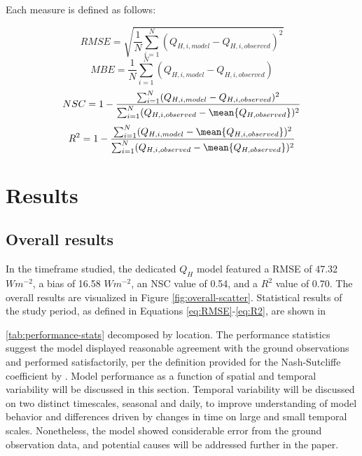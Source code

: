 Each measure is defined as follows:

\begin{equation} \label{eq:RMSE}
    RMSE = \sqrt{\frac{1}{N} \sum_{i=1}^{N}(Q_{H, i, model} - Q_{H, i, observed})^2}
\end{equation}
\begin{equation} \label{eq:MBE}
    MBE = \frac{1}{N} \sum_{i=1}^{N} (Q_{H, i, model} - Q_{H, i, observed})
\end{equation}
\begin{equation} \label{eq:NSC}
    NSC = 1 - \frac{\sum_{i=1}^{N} (Q_{H, i, model} - Q_{H, i, observed})^2}{\sum_{i=1}^{N}(Q_{H, i, observed} - \mean{Q_{H, observed}})^2}
\end{equation} 
\begin{equation} \label{eq:R2}
    R^2 = 1 - \frac{\sum_{i=1}^{N}(Q_{H, i, model} - \mean{Q_{H, i, observed}})^2}{\sum_{i=1}^{N}(Q_{H, i, observed} - \mean{Q_{H, observed}})^2}
\end{equation}

\section{Results}

\subsection{Overall results}
In the timeframe studied, the dedicated $Q_H$ model featured a RMSE of 47.32 $W m^{-2}$, a bias of 16.58 $W m^{-2}$, an NSC value of 0.54, and a $R^2$ value of 0.70. The overall results are visualized in Figure \ref{fig:overall-scatter}. Statistical results of the study period, as defined in Equations \ref{eq:RMSE}-\ref{eq:R2}, are shown in 

 \ref{tab:performance-stats} decomposed by location. The performance statistics suggest the model displayed reasonable agreement with the ground observations and performed satisfactorily, per the definition provided for the Nash-Sutcliffe coefficient by \citet{Moriasi_2007}.  Model performance as a function of spatial and temporal variability will be discussed in this section. Temporal variability will be discussed on two distinct timescales, seasonal and daily, to improve understanding of model behavior and differences driven by changes in time on large and small temporal scales.  Nonetheless, the model showed considerable error from the ground observation data, and potential causes will be addressed further in the paper. 

